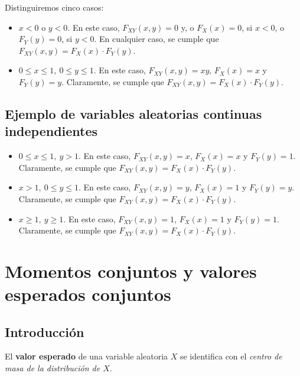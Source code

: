 \documentclass[]{book}
\begin{document}
Distinguiremos cinco casos:

\begin{itemize}
\item
  \(x<0\) o \(y<0\). En este caso, \(F_{XY}(x,y)=0\) y, o \(F_X(x)=0\), si \(x<0\), o \(F_Y(y)=0\), si \(y<0\). En cualquier caso, se cumple que \(F_{XY}(x,y)=F_X(x)\cdot F_Y(y)\).
\item
  \(0\leq x\leq 1,\ 0\leq y\leq 1\). En este caso, \(F_{XY}(x,y)=xy\), \(F_X(x)=x\) y \(F_Y(y)=y\). Claramente, se cumple que \(F_{XY}(x,y)=F_X(x)\cdot F_Y(y)\).
\end{itemize}

\hypertarget{ejemplo-de-variables-aleatorias-continuas-independientes-2}{%
\subsection{Ejemplo de variables aleatorias continuas independientes}\label{ejemplo-de-variables-aleatorias-continuas-independientes-2}}

\begin{itemize}
\item
  \(0\leq x\leq 1,\ y> 1\). En este caso, \(F_{XY}(x,y)=x\), \(F_X(x)=x\) y \(F_Y(y)=1\). Claramente, se cumple que \(F_{XY}(x,y)=F_X(x)\cdot F_Y(y)\).
\item
  \(x >1,\ 0\leq y\leq 1\). En este caso, \(F_{XY}(x,y)=y\), \(F_X(x)=1\) y \(F_Y(y)=y\). Claramente, se cumple que \(F_{XY}(x,y)=F_X(x)\cdot F_Y(y)\).
\item
  \(x\geq 1,\ y\geq 1\). En este caso, \(F_{XY}(x,y)=1\), \(F_X(x)=1\) y \(F_Y(y)=1\). Claramente, se cumple que \(F_{XY}(x,y)=F_X(x)\cdot F_Y(y)\).
\end{itemize}

\hypertarget{momentos-conjuntos-y-valores-esperados-conjuntos}{%
\section{Momentos conjuntos y valores esperados conjuntos}\label{momentos-conjuntos-y-valores-esperados-conjuntos}}

\hypertarget{introducciuxf3n-7}{%
\subsection{Introducción}\label{introducciuxf3n-7}}

El \textbf{valor esperado} de una variable aleatoria \(X\) se identifica con el \emph{centro de masa de la distribución de \(X\)}.
\end{document}
